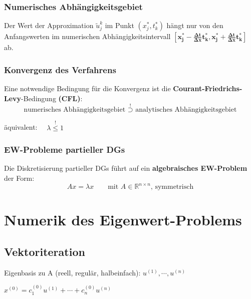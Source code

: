 		\subsubsection{Numerisches Abhängigkeitsgebiet}
			Der Wert der Approximation $\tilde u_j^k$ im Punkt $(x_j^*,t_k^*)$ hängt nur von den Anfangswerten im numerischen Abhängigkeitsintervall $\mathbf{\left[ x_j^* - \frac{\Delta t}{\Delta x}t_k^*, x_j^* + \frac{\Delta t}{\Delta x}t_k^*\right]}$ ab. 
		
		\subsubsection{Konvergenz des Verfahrens}
			Eine notwendige Bedingung für die Konvergenz ist die \textbf{Courant-Friedrichs-Levy}-Bedingung \textbf{(CFL)}:
			\[
				\text{numerisches Abhängigkeitsgebiet } \overset{!}{\supset} \text{ analytisches Abhängigkeitsgebiet}
			\]
			
			äquivalent: $\quad \lambda \overset{!}{\leq} 1$
			
		\subsubsection{EW-Probleme partieller DGs}
			Die Diskretisierung partieller DGs führt auf ein \textbf{algebraisches EW-Problem} der Form:
			\[
				Ax = \lambda x \qquad \text{mit } A \in \mathbb{R}^{n \times n}\text{, symmetrisch}
			\]

\section{Numerik des Eigenwert-Problems} 
	\subsection{Vektoriteration} 
		\begin{tightitemize}
			\item Eigenbasis zu A (reell, regulär, halbeinfach): $u^{(1)}, \cdots , u^{(n)}$
			\item $x^{(0)}=c_1^{(0)}u^{(1)} + \cdots + c_n^{(0)}u^{(n)}$
		\end{tightitemize}
		
